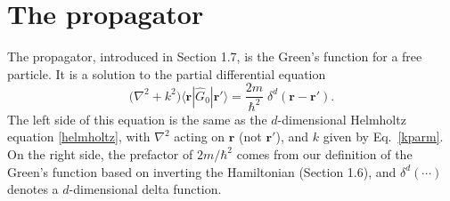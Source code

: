 \documentclass[pra,12pt]{revtex4}
\begin{document}
\section{The propagator}

The propagator, introduced in Section 1.7, is the Green's function for
a free particle.  It is a solution to the partial differential
equation
\begin{equation}
  \Big(\nabla^2 + k^2\Big) \langle\mathbf{r} |\hat{G}_0 |\mathbf{r}'\rangle
  = \frac{2m}{\hbar^2} \; \delta^d(\mathbf{r}-\mathbf{r}').
\end{equation}
The left side of this equation is the same as the $d$-dimensional
Helmholtz equation \eqref{helmholtz}, with $\nabla^2$ acting on
$\mathbf{r}$ (not $\mathbf{r}'$), and $k$ given by Eq.~\eqref{kparm}.
On the right side, the prefactor of $2m/\hbar^2$ comes from our
definition of the Green's function based on inverting the Hamiltonian
(Section 1.6), and $\delta^d(\cdots)$ denotes a $d$-dimensional delta
function.
\end{document}
